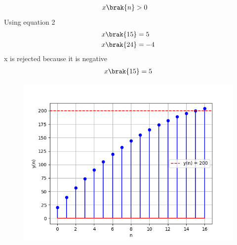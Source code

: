 \documentclass[journal,12pt,twocolumn]{IEEEtran}
\theoremstyle{remark}
\begin{document}
  \begin{align}
 & x\brak{n}>0\end{align}
Using equation 2
\begin{align} &x\brak{15}=5\\
 &x\brak{24}=-4 \end{align}
x is rejected because it is negative
\begin{align}x\brak{15}=5\end{align}
\newpage
\begin{figure}
   \includegraphics[width=2\linewidth]{figs/f2.png}
\end{figure}
\end{document}
